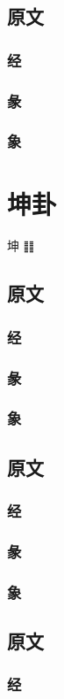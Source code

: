 \documentclass[12pt,oneside]{book}
\begin{document}
\section{原文}
\subsection{经}
\subsection{彖}
\subsection{象}
\chapter{坤卦}
坤 ䷁

\section{原文}
\subsection{经}
\subsection{彖}
\subsection{象}

\section{原文}
\subsection{经}
\subsection{彖}
\subsection{象}

\section{原文}
\subsection{经}
\end{document}

